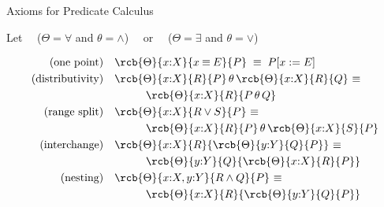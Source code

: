\documentclass{beamer}
\def\dimp{\mathbin{\equiv}}
\def\e{\mathbin{\wedge}}
\def\ou{\mathbin{\vee}}
\begin{document}
\begin{slide}{Axioms for Predicate Calculus}

\begin{block}{Let ~~($\Theta = \forall$ and $\theta = {\land}$) ~~or~~ ($\Theta = \exists$ and $\theta = {\lor}$)} 

\begin{align*}
\text{(one point)} && & \rcb{\Theta}{x{:}X}{x \dimp E}{P} ~\dimp~ P[x:=E] \\
\text{(distributivity)} && & \rcb{\Theta}{x{:}X}{R}{P} \, \theta\,  \rcb{\Theta}{x{:}X}{R}{Q} ~\dimp~ \\ &&& \hspace{1cm} \rcb{\Theta}{x{:}X}{R}{P \,\theta\, Q}\\
\text{(range split)} && & \rcb{\Theta}{x{:}X}{R \ou S}{P} ~\dimp~ \\ &&& \hspace{1cm}\rcb{\Theta}{x{:}X}{R}{P} \, \theta\, \rcb{\Theta}{x{:}X}{S}{P} \\
\text{(interchange)} && & \rcb{\Theta}{x{:}X}{R}{\rcb{\Theta}{y{:}Y}{Q}{P}} ~\dimp~ \\ &&& \hspace{1cm}  \rcb{\Theta}{y{:}Y}{Q}{\rcb{\Theta}{x{:}X}{R}{P}}\\
\text{(nesting)} && & \rcb{\Theta}{x{:}X, y{:}Y}{R \e Q}{P} ~\dimp~ \\ &&& \hspace{1cm}  \rcb{\Theta}{x{:}X}{R}{\rcb{\Theta}{y{:}Y}{Q}{P}} 
\end{align*}
\end{block}
\end{slide}
\end{document}
